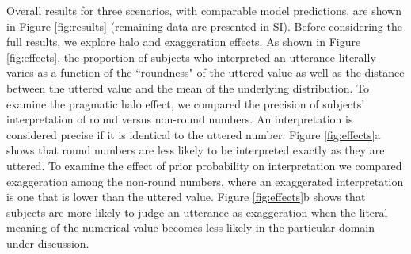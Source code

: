 \documentclass{article} %
\begin{document}
Overall results for three scenarios, with comparable model predictions, are shown in Figure \ref{fig:results} (remaining data are presented in SI). Before considering the full results, we explore halo and exaggeration effects. As shown in Figure \ref{fig:effects}, the proportion of subjects who interpreted an utterance literally varies as a function of the ``roundness" of the uttered value as well as the distance between the uttered value and the mean of the underlying distribution. To examine the pragmatic halo effect, we compared the precision of subjects' interpretation of round versus non-round numbers.
An interpretation is considered precise if it is identical to the uttered number. Figure \ref{fig:effects}a shows that round numbers are less likely to be interpreted exactly as they are uttered. 
To examine the effect of prior probability on interpretation we compared exaggeration among the non-round numbers, where an exaggerated interpretation is one that is lower than the uttered value. Figure \ref{fig:effects}b shows that subjects are more likely to judge an utterance as exaggeration when the literal meaning of the numerical value becomes less likely in the particular domain under discussion. 


\end{document}
